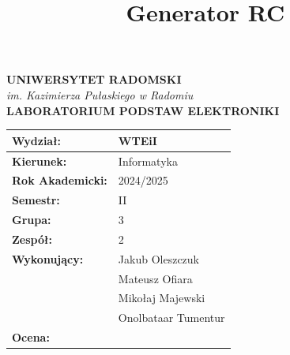 \documentclass[11pt]{article}
\title{Generator RC}
\date{}
\begin{document}
\thispagestyle{empty} %

\begin{center}
    {\Large\textbf{UNIWERSYTET RADOMSKI}} \\
    \textit{im. Kazimierza Pułaskiego w Radomiu} \\
    \vspace{0.3cm}
    {\large\textbf{LABORATORIUM PODSTAW ELEKTRONIKI}} \\
\end{center}

\vspace{1.5cm}

\begin{center}
\end{center}

\vspace{1.5cm}

\begin{center}
\begin{tabular}{|>{\bfseries}p{4cm}|p{6cm}|}
\hline
Wydział: & WTEiI \\
\hline
Kierunek: & Informatyka \\
\hline
Rok Akademicki: & 2024/2025 \\
\hline
Semestr: & II \\
\hline
Grupa: & 3 \\
\hline
Zespół: & 2 \\
\hline
Wykonujący: & Jakub Oleszczuk \\
& Mateusz Ofiara \\
& Mikołaj Majewski \\
& Onolbataar Tumentur \\
\hline
Ocena: &  \\
\hline
\end{tabular}
\end{center}

\vspace{2cm}
\end{document}
